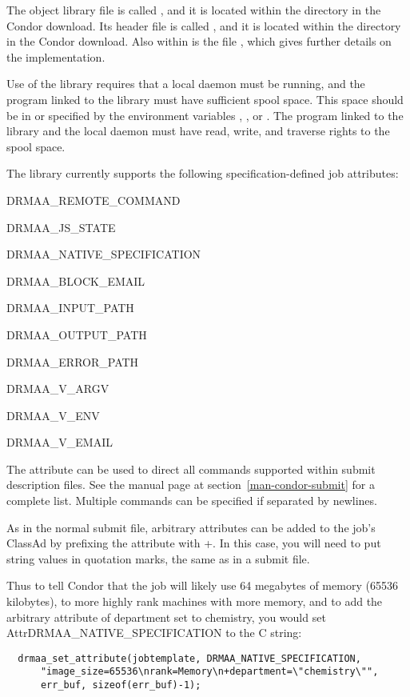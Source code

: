 The object library file is called ,
and it is located within
the  directory in the Condor download.
Its header file  is called , and it is located within
the  directory in the Condor download.
Also within  is the file
,
which gives further details on the implementation.

Use of the library requires that a
local  daemon  must be running,
and the program linked to the library must have
sufficient spool space.
This space should be in 
or specified by the environment variables
, , or .
The program linked to the library and the local  daemon
must have read, write, and traverse rights to the spool space.

The library currently supports the following specification-defined
job attributes:
\begin{description}
\item{DRMAA\_REMOTE\_COMMAND}
\item{DRMAA\_JS\_STATE}
\item{DRMAA\_NATIVE\_SPECIFICATION}
\item{DRMAA\_BLOCK\_EMAIL}
\item{DRMAA\_INPUT\_PATH}
\item{DRMAA\_OUTPUT\_PATH}
\item{DRMAA\_ERROR\_PATH}
\item{DRMAA\_V\_ARGV}
\item{DRMAA\_V\_ENV}
\item{DRMAA\_V\_EMAIL}
\end{description}

The attribute  can be used
to direct all commands supported within
submit description files.  
See the  manual page at
section~\ref{man-condor-submit} for a complete list.
Multiple commands can be specified if separated by newlines.  

As in the normal submit file,
arbitrary attributes can be added to the job's ClassAd
by prefixing the attribute with +.  In this case, you will need to put
string values in quotation marks, the same as in a submit file.

Thus to tell Condor that the job will likely use 64 megabytes of memory (65536
kilobytes), to more highly rank machines with more memory, and to add the
arbitrary attribute of department set to chemistry, you would set
Attr{DRMAA\_NATIVE\_SPECIFICATION} to the C string:

\begin{verbatim}
  drmaa_set_attribute(jobtemplate, DRMAA_NATIVE_SPECIFICATION,
      "image_size=65536\nrank=Memory\n+department=\"chemistry\"",
      err_buf, sizeof(err_buf)-1);

\end{verbatim}

